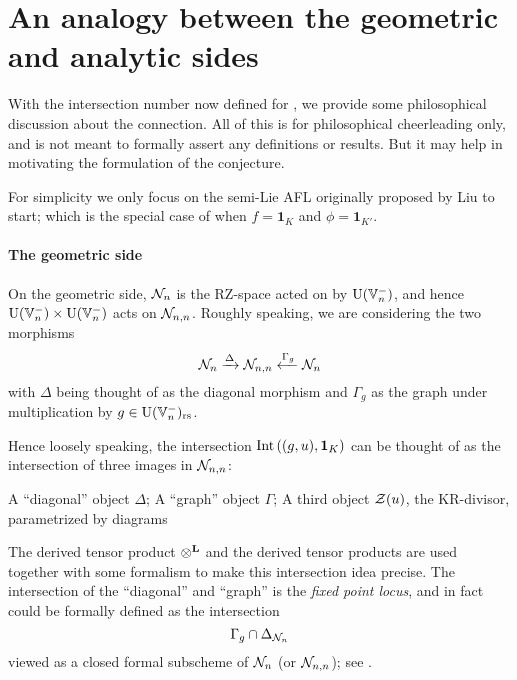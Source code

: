 \section{An analogy between the geometric and analytic sides}
With the intersection number now defined for ,
we provide some philosophical discussion about the connection.
All of this is for philosophical cheerleading only,
and is not meant to formally assert any definitions or results.
But it may help in motivating the formulation of the conjecture.

For simplicity we only focus on the semi-Lie AFL originally proposed by Liu to start;
which is the special case of 
when $f = \mathbf{1}_K$ and $\phi = \mathbf{1}_{K'}$.

\paragraph{The geometric side}
On the geometric side, $\mathcal N_n$ is the RZ-space acted on by $\operatorname{U}(\mathbb V_n^-)$,
and hence $\operatorname{U}(\mathbb V_n^-) \times \operatorname{U}(\mathbb V_n^-)$ acts on $\mathcal N_{n,n}$.
Roughly speaking, we are considering the two morphisms
\[ \mathcal N_n \xrightarrow{\Delta} \mathcal N_{n,n} \xleftarrow{\Gamma_g} \mathcal N_n \]
with $\Delta$ being thought of as the diagonal morphism
and $\Gamma_g$ as the graph under multiplication by $g \in \operatorname{U}(\mathbb V_n^-)_{\mathrm{rs}}$.

Hence loosely speaking, the intersection $\operatorname{Int}\left( (g,u), \mathbf{1}_K \right)$
can be thought of as the intersection of three images in $\mathcal N_{n,n}$:
\begin{itemize}
  \ii A ``diagonal'' object $\Delta$;
  \ii A ``graph'' object $\Gamma$;
  \ii A third object $\mathcal Z(u)$, the KR-divisor, parametrized by diagrams
  \begin{center}
  \end{center}
\end{itemize}
The derived tensor product $\mathop{\otimes}^{\mathbf{L}}$ and the derived tensor products
are used together with some formalism to make this intersection idea precise.
The intersection of the ``diagonal'' and ``graph'' is the \emph{fixed point locus},
and in fact could be formally defined as the intersection
\[ \Gamma_g \cap \Delta_{\mathcal N_n} \]
viewed as a closed formal subscheme of $\mathcal N_n$ (or $\mathcal N_{n,n}$);
see \cite[equation (4.6)]{ref:survey}.

